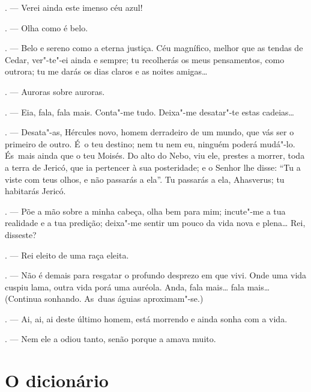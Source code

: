 \begin{linenumbers}
\begin{Parskip}
. --- Verei ainda este imenso céu azul!

. --- Olha como é belo.

. --- Belo e sereno como a eterna justiça. Céu magnífico, melhor
que as tendas de Cedar, ver"-te"-ei ainda e sempre; tu recolherás os meus
pensamentos, como outrora; tu me darás os dias claros e as noites
amigas\ldots{}

. --- Auroras sobre auroras.

. --- Eia, fala, fala mais. Conta"-me tudo. Deixa"-me desatar"-te
estas cadeias\ldots{}

. --- Desata"-as, Hércules novo, homem derradeiro de um mundo, que
vás ser o primeiro de outro. É~o teu destino; nem tu nem eu, ninguém
poderá mudá"-lo. És~mais ainda que o teu Moisés. Do alto do Nebo, viu
ele, prestes a morrer, toda a terra de Jericó, que ia pertencer à sua
posteridade; e o Senhor lhe disse: ``Tu a viste com teus olhos, e não
passarás a ela''. Tu passarás a ela, Ahasverus; tu habitarás Jericó.

. --- Põe a mão sobre a minha cabeça, olha bem para mim;
incute"-me a tua realidade e a tua predição; deixa"-me sentir um pouco da
vida nova e plena\ldots{} Rei, disseste?

. --- Rei eleito de uma raça eleita.

. --- Não é demais para resgatar o profundo desprezo em que
vivi. Onde uma vida cuspiu lama, outra vida porá uma auréola. Anda, fala
mais\ldots{} fala mais\ldots{} (Continua sonhando. As~duas águias aproximam"-se.)

. --- Ai, ai, ai deste último homem, está morrendo e ainda sonha
com a vida.

. --- Nem ele a odiou tanto, senão porque a amava muito.
\end{Parskip}

\end{linenumbers}

\chapter{O dicionário}

